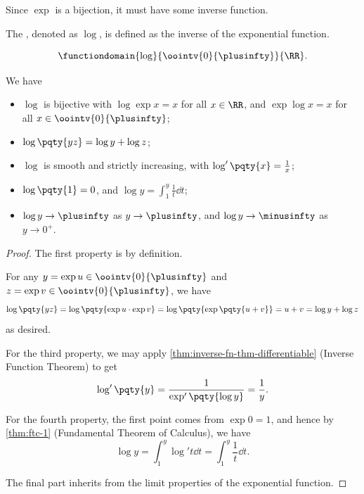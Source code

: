 Since \(\exp\) is a bijection, it must have some inverse function.

\begin{definition}
    \label{def:log}%
    The , denoted as \(\log\), is defined as the inverse of the exponential function.

    \[
        \functiondomain{\log}{\oointv{0}{\plusinfty}}{\RR}.
    \]
\end{definition}

\begin{lemma}
    \label{lem:properties-log}%
    We have
    \begin{itemize}
        \item \(\log\) is bijective with \(\log \exp x = x\) for all \(x \in \RR\), and \(\exp \log x = x\) for all \(x \in \oointv{0}{\plusinfty}\);
        \item \(\log\pqty{yz} = \log y + \log z\);
        \item \(\log\) is smooth and strictly increasing, with \(\log' \pqty{x} = \frac{1}{x}\);
        \item \(\log\pqty{1} = 0\), and \(\log y = \int_1^y \frac{1}{t} \dd{t}\);
        \item \(\log y \to \plusinfty\) as \(y \to \plusinfty\), and \(\log y \to \minusinfty\) as \(y \to 0^+\).
    \end{itemize}
\end{lemma}

\begin{proof}
    The first property is by definition.

    For any \(y = \exp u \in \oointv{0}{\plusinfty}\) and \(z = \exp v \in \oointv{0}{\plusinfty}\), we have
    \[
        \log \pqty{yz} = \log \pqty{\exp u \cdot \exp v} = \log \pqty{\exp \pqty{u + v}} = u + v = \log y + \log z
    \]
    as desired.

    For the third property, we may apply \autoref{thm:inverse-fn-thm-differentiable} (Inverse Function Theorem) to get
    \[
        \log'\pqty{y} = \frac{1}{\exp'\pqty{\log y}} = \frac{1}{y}.
    \]

    For the fourth property, the first point comes from \(\exp 0 = 1\), and hence by \autoref{thm:ftc-1} (Fundamental Theorem of Calculus), we have
    \[
        \log y = \int_1^y \log' t \dd{t} = \int_1^y \frac{1}{t} \dd{t}.
    \]

    The final part inherits from the limit properties of the exponential function.
\end{proof}

